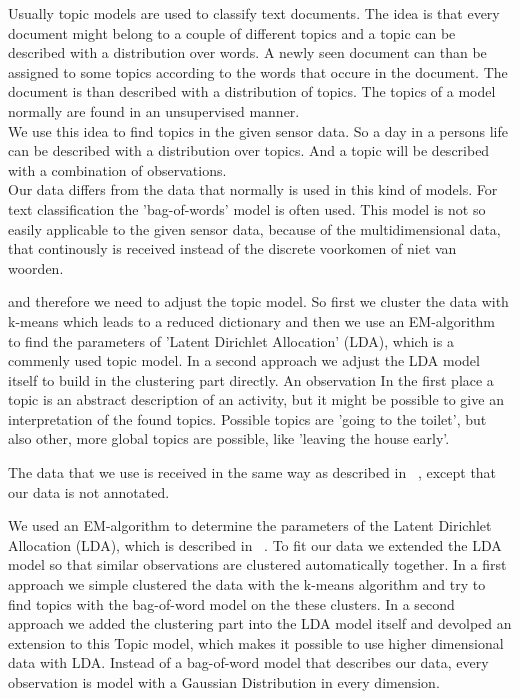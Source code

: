 \documentclass[11pt,a4paper]{article}
\begin{document}
Usually topic models are used to classify text documents. The idea is that every document might belong to a couple of different topics and a topic can be described with a distribution over words. A newly seen document can than be assigned to some topics according to the words that occure in the document. The document is than described with a distribution of topics. The topics of a model normally are found in an unsupervised manner.\\
We use this idea to find topics in the given sensor data. So a day in a persons life can be described with a distribution over topics. And a topic will be described with a combination of observations.\\
Our data differs from the data that normally is used in this kind of models. For text classification the 'bag-of-words' model is often used. This model is not so easily applicable to the given sensor data, because of the multidimensional data, that continously is received instead of the discrete voorkomen of niet van woorden.

and therefore we need to adjust the topic model. So first we cluster the data with k-means which leads to a reduced dictionary and then we use an EM-algorithm to find the parameters of 'Latent Dirichlet Allocation' (LDA), which is a commenly used topic model.
In a second approach we adjust the LDA model itself to build in the clustering part directly. An observation 
In the first place a topic is an abstract description of an activity, but it might be possible to give an interpretation of the found topics. Possible topics are 'going to the toilet', but also other, more global topics are possible, like 'leaving the house early'. 


The data that we use is received in the same way as described in ~\cite{van2010activity}, except that our data is not annotated.


We used an EM-algorithm to determine the parameters of the Latent Dirichlet Allocation (LDA), which is described in ~\cite{blei2003latent}. To fit our data we extended the LDA model so that similar observations are clustered automatically together.
In a first approach we simple clustered the data with the k-means algorithm and try to find topics with the bag-of-word model on the these clusters. In a second approach we added the clustering part into the LDA model itself and devolped an extension to this Topic model, which makes it possible to use higher dimensional data with LDA. Instead of a bag-of-word model that describes our data, every observation is model with a Gaussian Distribution in every dimension.
\end{document}
